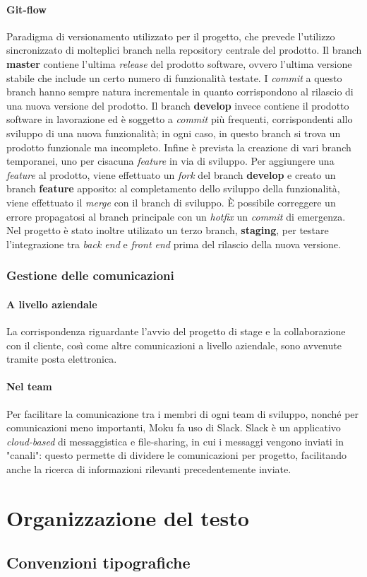 \paragraph{Git-flow} Paradigma di versionamento utilizzato per il progetto, che prevede l'utilizzo sincronizzato di molteplici branch nella repository centrale del prodotto. Il branch \textbf{master} contiene l'ultima \textit{release} del prodotto software, ovvero l'ultima versione stabile che include un certo numero di funzionalità testate. I \textit{commit} a questo branch hanno sempre natura incrementale in quanto corrispondono al rilascio di una nuova versione del prodotto. Il branch \textbf{develop} invece contiene il prodotto software in lavorazione ed è soggetto a \textit{commit} più frequenti, corrispondenti allo sviluppo di una nuova funzionalità; in ogni caso, in questo branch si trova un prodotto funzionale ma incompleto. Infine è prevista la creazione di vari branch temporanei, uno per cisacuna \textit{feature} in via di sviluppo. Per aggiungere una \textit{feature} al prodotto, viene effettuato un \textit{fork} del branch \textbf{develop} e creato un branch  \textbf{feature} apposito: al completamento dello sviluppo della funzionalità, viene effettuato il \textit{merge} con il branch di sviluppo. È possibile correggere un errore propagatosi al branch principale con un \textit{hotfix} un \textit{commit} di emergenza.
Nel progetto è stato inoltre utilizato un terzo branch, \textbf{staging}, per testare l'integrazione tra \textit{back end} e \textit{front end} prima del rilascio della nuova versione.

\subsubsection{Gestione delle comunicazioni}
\paragraph{A livello aziendale} La corrispondenza riguardante l'avvio del progetto di stage e la collaborazione con il cliente, così come altre comunicazioni a livello aziendale, sono avvenute tramite posta elettronica.
\paragraph{Nel team} Per facilitare la comunicazione tra i membri di ogni team di sviluppo, nonché per comunicazioni meno importanti, Moku fa uso di Slack. Slack è un applicativo \textit{cloud-based} di messaggistica e file-sharing, in cui i messaggi vengono inviati in "canali": questo permette di dividere le comunicazioni per progetto, facilitando anche la ricerca di informazioni rilevanti precedentemente inviate.

\section{Organizzazione del testo}

\subsection{Convenzioni tipografiche}
